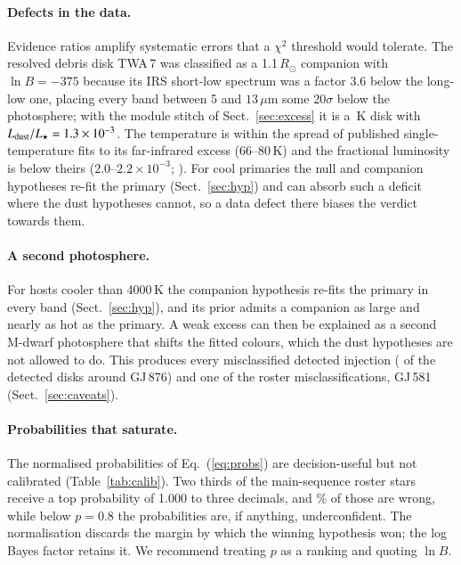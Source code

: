 \documentclass{aa}
\newcommand{\Rsun}{R_\odot}
\begin{document}
\paragraph{Defects in the data.} Evidence ratios amplify systematic errors that a
$\chi^2$ threshold would tolerate. The resolved debris disk TWA\,7 was classified
as a 1.1\,$\Rsun$ companion with $\ln B = -375$ because its IRS short-low
spectrum was a factor 3.6 below the long-low one, placing every band between 5
and $13\,\mu$m some 20$\sigma$ below the photosphere; with the module stitch of
Sect.~\ref{sec:excess} it is a \twaTd\,K disk with
$L_{\rm dust}/L_\star = 1.3\times10^{-3}$. The temperature is within the spread of published
single-temperature fits to its far-infrared excess (66--80\,K) and the fractional
luminosity is below theirs ($2.0$--$2.2\times10^{-3}$; \citealt{low2005,riviere2013}). For cool primaries the null and companion hypotheses re-fit the
primary (Sect.~\ref{sec:hyp}) and can absorb such a deficit where the dust
hypotheses cannot, so a data defect there biases the verdict towards them.

\paragraph{A second photosphere.} For hosts cooler than 4000\,K the companion
hypothesis re-fits the primary in every band (Sect.~\ref{sec:hyp}), and its prior
admits a companion as large and nearly as hot as the primary. A weak excess can
then be explained as a second M-dwarf photosphere that shifts the fitted colours,
which the dust hypotheses are not allowed to do. This produces every
misclassified detected injection (\injDetCompGJ{} of the \injDetGJ{} detected disks around
GJ\,876) and one of the \rosDCwrong{} roster misclassifications, GJ\,581
(Sect.~\ref{sec:caveats}).

\paragraph{Probabilities that saturate.} The normalised probabilities of
Eq.~(\ref{eq:probs}) are decision-useful but not calibrated
(Table~\ref{tab:calib}). Two thirds of the main-sequence roster stars receive a
top probability of 1.000 to three decimals, and \relSatWrongPct\% of those are wrong, while
below $p = 0.8$ the probabilities are, if anything, underconfident. The
normalisation discards the
margin by which the winning hypothesis won; the log Bayes factor retains it. We
recommend treating $p$ as a ranking and quoting $\ln B$.
\end{document}
